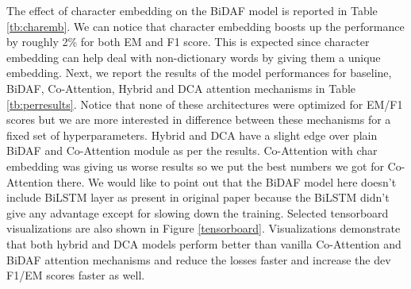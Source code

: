 \documentclass{article} %
\begin{document}
The effect of character embedding on the BiDAF model is reported in Table \ref{tb:charemb}. We can notice that character embedding boosts up the performance by roughly 2\% for both EM and F1 score. This is expected since character embedding can help deal with non-dictionary words by giving them a unique embedding.  Next, we report the results of the model performances for baseline, BiDAF, Co-Attention, Hybrid and DCA attention mechanisms in Table \ref{tb:perresults}. Notice that none of these architectures were optimized for EM/F1 scores but we are more interested in difference between these mechanisms for a fixed set of hyperparameters. Hybrid and DCA have a slight edge over plain BiDAF and Co-Attention module as per the results. Co-Attention with char embedding was giving us worse results so we put the best numbers we got for Co-Attention there. We would like to point out that the BiDAF model here doesn't include BiLSTM layer as present in original paper because the BiLSTM didn't give any advantage except for slowing down the training. Selected tensorboard visualizations are also shown in Figure \ref{tensorboard}. Visualizations demonstrate that both hybrid and DCA models perform better than vanilla Co-Attention and BiDAF attention mechanisms and reduce the losses faster and increase the dev F1/EM scores faster as well.
\end{document}
